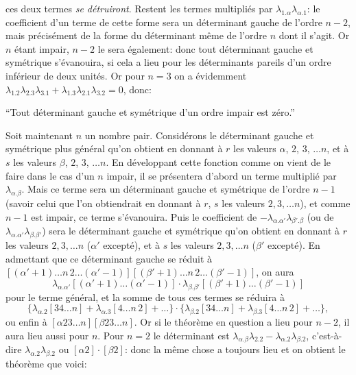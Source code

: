 \documentclass[11pt]{article}
\begin{document}
\vfill\pagebreak

ces deux termes \textit{se d\'etruiront}. Restent les termes multipli\'es par $\lambda_{1.\alpha}\lambda_{\alpha.1}$: le coefficient
d'un terme de cette forme sera un d\'eterminant gauche de l'ordre $n - 2$, mais pr\'ecis\'ement
de la forme du d\'eterminant m\^eme de l'ordre $n$ dont il s'agit. Or $n$ \'etant impair,
$n - 2$ le sera \'egalement: donc tout d\'eterminant gauche et sym\'etrique s'\'evanouira, si
cela a lieu pour les d\'eterminants pareils d'un ordre inf\'erieur de deux unit\'es. Or pour
$n = 3$ on a \'evidemment $\lambda_{1.2}\lambda_{2.3}\lambda_{3.1} + \lambda_{1.3}\lambda_{2.1}\lambda_{3.2} = 0$, donc:

\medskip

``Tout d\'eterminant gauche et sym\'etrique d'un ordre impair est z\'ero.''

\medskip

Soit maintenant $n$ un nombre pair. Consid\'erons le d\'eterminant gauche et sym\'etrique
plus g\'en\'eral qu'on obtient en donnant \`a $r$ les valeurs $\alpha$, $2$, $3$, $\ldots n$, et \`a $s$ les
valeurs $\beta$, $2$, $3$, $\ldots n$. En d\'eveloppant cette fonction comme on vient de le faire dans
le cas d'un $n$ impair, il se pr\'esentera d'abord un terme multipli\'e par $\lambda_{\alpha.\beta}$. Mais ce
terme sera un d\'eterminant gauche et sym\'etrique de l'ordre $n - 1$ (savoir celui que l'on
obtiendrait en donnant \`a $r$, $s$ les valeurs $2, 3, \ldots n$), et comme $n - 1$ est impair, ce
terme s'\'evanouira. Puis le coefficient de $-\lambda_{\alpha.\alpha'}\lambda_{\beta'.\beta}$ (ou de $\lambda_{\alpha.\alpha'}\lambda_{\beta.\beta'}$) sera le d\'eterminant
gauche et sym\'etrique qu'on obtient en donnant \`a $r$ les valeurs $2, 3, \ldots n$ ($\alpha'$ except\'e),
et \`a $s$ les valeurs $2, 3, \ldots n$ ($\beta'$ except\'e). En admettant que ce d\'eterminant gauche
se r\'eduit \`a $[(\alpha'+1)\ldots n\,2\ldots(\alpha'-1)][(\beta'+1)\ldots n\,2\ldots(\beta'-1)]$, on aura
\[
\lambda_{\alpha.\alpha'}[(\alpha'+1)\ldots(\alpha'-1)]\cdot\lambda_{\beta.\beta'}[(\beta'+1)\ldots(\beta'-1)]
\]
pour le terme g\'en\'eral, et la somme de tous ces termes se r\'eduira \`a
\[
\{\lambda_{\alpha.2}[34\ldots n] + \lambda_{\alpha.3}[4\ldots n\,2] + \ldots\}\cdot\{\lambda_{\beta.2}[34\ldots n] + \lambda_{\beta.3}[4\ldots n\,2] + \ldots\},
\]
ou enfin \`a $[\alpha 23\ldots n][\beta 23\ldots n]$. Or si le th\'eor\`eme en question a lieu pour $n - 2$,
il aura lieu aussi pour $n$. Pour $n = 2$ le d\'eterminant est $\lambda_{\alpha.\beta}\lambda_{2.2} - \lambda_{\alpha.2}\lambda_{\beta.2}$, c'est-\`a-dire
$\lambda_{\alpha.2}\lambda_{\beta.2}$ ou $[\alpha 2]\cdot[\beta 2]$: donc la m\^eme chose a toujours lieu et on obtient le th\'eor\`eme
que voici:
\end{document}

